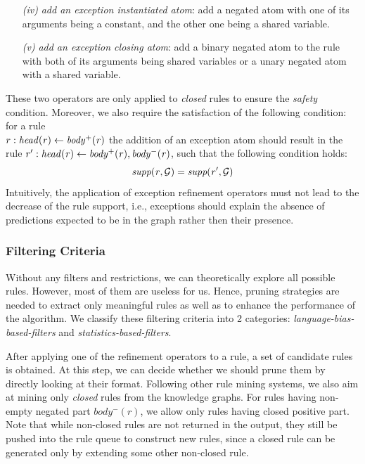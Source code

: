 \begin{enumerate}
\item[\it (iv)] \textit{add an exception instantiated atom}: add a negated atom with one of its arguments being a constant, and the other one being a shared variable. 
\item[\it (v)] \textit{add an exception closing atom}: add a binary negated atom to the rule with both of its arguments being shared variables or a unary negated atom with a shared variable. 
\end{enumerate}
%
These two operators are only applied to \textit{closed} rules to ensure the \textit{safety} condition.
Moreover, we also require the satisfaction of the following condition:
for a rule \\$r:\mathit{head(r)\leftarrow body^+(r)}$ the addition of an exception atom should result in the rule $r': \mathit{head(r)\leftarrow body^+(r), body^-(r)}$, such that the following condition holds:
\begin{equation}
\mathit{\textit{supp}(r,\mathcal{G})=\textit{supp}(r',\mathcal{G})}
\end{equation}
Intuitively, the application of exception refinement operators must not lead to the decrease of the rule support, i.e., exceptions should explain the absence of predictions expected to be in the graph rather then their presence.


\subsubsection{Filtering Criteria}
Without any filters and restrictions, we can theoretically explore all possible rules. However, most of them are useless for us. Hence, pruning strategies are needed to extract only meaningful rules as well as to enhance the performance of the algorithm. We classify these filtering criteria into 2 categories: \textit{language-bias-based-filters} and \textit{statistics-based-filters}.


After applying one of the refinement operators to a rule, 
a set of candidate rules is obtained. At this step, we can decide whether we should prune them by directly looking at their format.
Following other rule mining systems, we also aim at mining only \textit{closed} rules from the knowledge graphs. For rules having non-empty negated part $body^-(r)$, we allow only rules having closed positive part. Note that while non-closed rules are not returned in the output, they still be pushed into the rule queue to construct new rules, since a closed rule can be generated only by extending some other non-closed rule.

